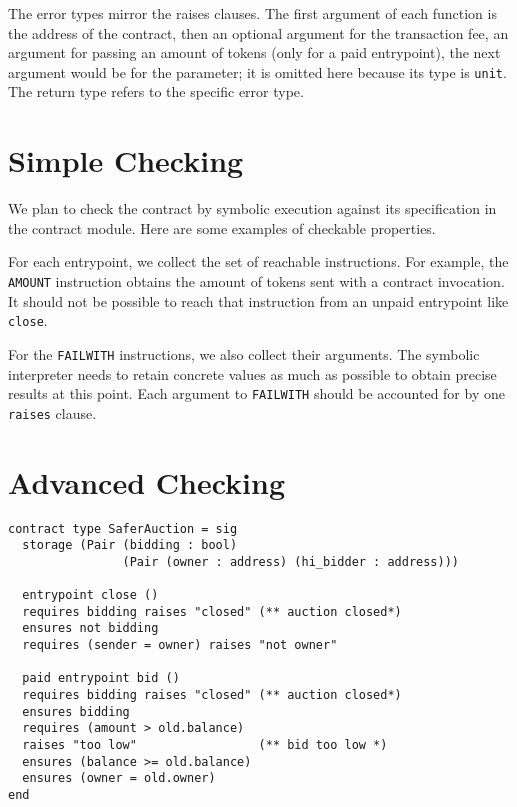 \documentclass[a4paper,USenglish,american,cleveref, autoref, thm-restate]{oasics-v2021}
\begin{document}
The error types mirror the raises clauses. The first argument of each
function is the address of the contract, then an optional argument for
the transaction fee, an argument for passing an amount of tokens
(only for a paid entrypoint), the next argument would be for
the parameter; it is omitted here because its type is
\lstinline/unit/. The return type refers to the specific error type.

\section{Simple Checking}
\label{sec:check-contr-against}

We plan to check the contract by symbolic execution against its
specification in the contract module. Here are some examples of
checkable properties.

For each entrypoint, we collect the set of reachable instructions.
For example, the  \lstinline/AMOUNT/ instruction obtains the amount of
tokens sent with a contract invocation.
It should not be possible to reach that instruction from an unpaid
entrypoint  like \lstinline/close/.

For the \lstinline/FAILWITH/ instructions, we also collect their
arguments. The symbolic interpreter needs to retain concrete values as
much as possible to obtain precise results at this point. Each
argument to \lstinline/FAILWITH/ should be accounted for by one
\lstinline/raises/ clause.

\section{Advanced Checking}
\label{sec:advanced-checking}
\begin{lstlisting}[float,captionpos=b,caption={Enhanced contract module},label={lst:safer-contract-module}]
contract type SaferAuction = sig
  storage (Pair (bidding : bool) 
                (Pair (owner : address) (hi_bidder : address)))

  entrypoint close ()
  requires bidding raises "closed" (** auction closed*)
  ensures not bidding
  requires (sender = owner) raises "not owner"

  paid entrypoint bid () 
  requires bidding raises "closed" (** auction closed*)
  ensures bidding
  requires (amount > old.balance)
  raises "too low"                 (** bid too low *)
  ensures (balance >= old.balance)
  ensures (owner = old.owner)
end
\end{lstlisting}
\end{document}
